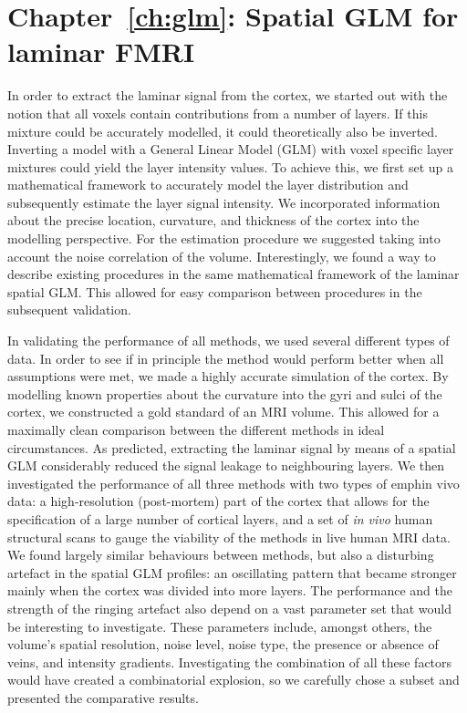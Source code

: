 \section*{Chapter~\ref{ch:glm}: Spatial GLM for laminar FMRI}
In order to extract the laminar signal from the cortex, we started out with the notion that all voxels contain contributions from a number of layers. If this mixture could be accurately modelled, it could theoretically also be inverted. Inverting a model with a General Linear Model (GLM) with voxel specific layer mixtures could yield the layer intensity values. To achieve this, we first set up a mathematical framework to accurately model the layer distribution and subsequently estimate the layer signal intensity. We incorporated information about the precise location, curvature, and thickness of the cortex into the modelling perspective. For the estimation procedure we suggested taking into account the noise correlation of the volume. Interestingly, we found a way to describe existing procedures in the same mathematical framework of the laminar spatial GLM. This allowed for easy comparison between procedures in the subsequent validation.

In validating the performance of all methods, we used several different types of data. In order to see if in principle the method would perform better when all assumptions were met, we made a highly accurate simulation of the cortex. By modelling known properties about the curvature into the gyri and sulci of the cortex, we constructed a gold standard of an MRI volume. This allowed for a maximally clean comparison between the different methods in ideal circumstances. As predicted, extracting the laminar signal by means of a spatial GLM considerably reduced the signal leakage to neighbouring layers. We then investigated the performance of all three methods with two types of 
emph{in vivo} data: a high-resolution (post-mortem) part of the cortex that allows for the specification of a large number of cortical layers, and a set of \emph{in vivo} human structural scans to gauge the viability of the methods in live human MRI data. We found largely similar behaviours between methods, but also a disturbing artefact in the spatial GLM profiles: an oscillating pattern that became stronger mainly when the cortex was divided into more layers. The performance and the strength of the ringing artefact also depend on a vast parameter set that would be interesting to investigate. These parameters include, amongst others, the volume's spatial resolution, noise level, noise type, the presence or absence of veins, and intensity gradients. Investigating the combination of all these factors would have created a combinatorial explosion, so we carefully chose a subset and presented the comparative results.


